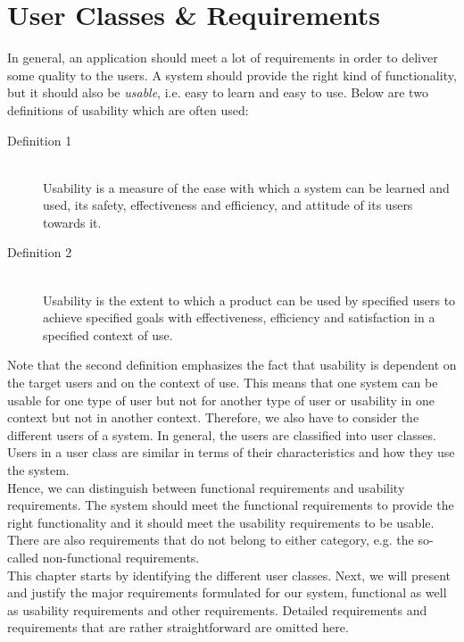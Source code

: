 \chapter{User Classes \& Requirements}\label{ch:requirements}

In general, an application should meet a lot of requirements in order to deliver some quality to the users. A system should provide the right kind of functionality, but it should also be \textit{usable}, i.e. easy to learn and easy to use. Below are two definitions of usability which are often used:
\begin{description}
	\item[Definition 1] \hfill \\
	Usability is a measure of the ease with which a system can be learned and used, its safety, effectiveness and efficiency, and attitude of its users towards it. \hfill \citep{usability-definition-preece}

	\item[Definition 2] \hfill \\
	Usability is the extent to which a product can be used by specified users to achieve specified goals with effectiveness, efficiency and satisfaction in a specified context of use. \hfill \citep{usability-definition-improved}
\end{description}

Note that the second definition emphasizes the fact that usability is dependent on the target users and on the context of use. This means that one system can be usable for one type of user but not for another type of user or usability in one context but not in another context. Therefore, we also have to consider the different users of a system. In general, the users are classified into user classes. Users in a user class are similar in terms of their characteristics and how they use the system.\\

Hence, we can distinguish between functional requirements and usability requirements. The system should meet the functional requirements to provide the right functionality and it should meet the usability requirements to be usable. There are also requirements that do not belong to either category, e.g. the so-called non-functional requirements.\\

This chapter starts by identifying the different user classes. Next, we will present and justify the major requirements formulated for our system, functional as well as usability requirements and other requirements. Detailed requirements and requirements that are rather straightforward are omitted here.


